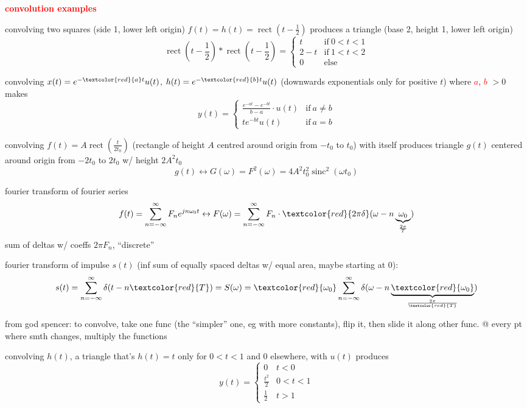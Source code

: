 \documentclass[a5paper, fleqn]{article}
\newcommand{\heading}[1]{\textbf{\textcolor{red}{#1}}}
\newcommand{\emf}[1]{\textcolor{red}{#1}}
\newcommand{\eq}[1]{\textcolor{red}{$#1$}}
\newcommand{\wrap}{\hangpara{0.5cm}{1}}
\DeclareMathOperator{\sinc}{sinc}
\DeclareMathOperator{\rect}{rect}
\begin{document}
\heading{convolution examples}

\wrap convolving two squares (side 1, lower left origin) $f(t) = h(t) = \rect\left(t - \frac{1}{2}\right)$ produces a triangle (base 2, height 1, lower left origin) \[\rect\left(t - \frac{1}{2}\right) * \rect\left(t - \frac{1}{2}\right) = \begin{cases}
    t     & \text{if} ~ 0 < t < 1 \\
    2 - t & \text{if} ~ 1 < t < 2 \\
    0     & \text{else}
  \end{cases}\]

\wrap convolving $x(t) = e^{-\emf{a}t} u(t)$, $h(t) = e^{-\emf{b}t} u(t)$ (downwards exponentials only for positive $t$) where \eq{a}, \eq{b} $> 0$ makes
\[y(t) = \begin{cases}
    \frac{e^{-at} - e^{-bt}}{b - a} \cdot u(t) & \text{if}~ a \neq b \\
    te^{-bt} u(t)                              & \text{if}~ a = b
  \end{cases}\]

\wrap convolving $f(t) = A \rect\left(\frac{t}{2t_0}\right)$ (rectangle of height $A$ centred around origin from $-t_0$ to $t_0$) with itself produces triangle $g(t)$ centered around origin from $-2t_0$ to $2t_0$ w/ height $2A^2t_0$
\[g(t) \leftrightarrow G(\omega) = F^2(\omega) = 4A^2t_0^2 \sinc^2(\omega t_0)\]

fourier transform of fourier series
\[f(t) = \sum_{n = -\infty}^\infty F_n e^{jn\omega_0 t} \leftrightarrow F(\omega) = \sum_{n = -\infty}^\infty F_n \cdot \emf{2\pi \delta}(\omega - n\underbrace{\omega_0}_{\frac{2\pi}{T}})\]
sum of deltas w/ coeffs $2\pi F_n$, ``discrete''

\wrap fourier transform of impulse $s(t)$ (inf sum of equally spaced deltas w/ equal area, maybe starting at 0):
\[s(t) = \sum_{n = -\infty}^\infty \delta(t - n\emf{T}) = S(\omega) = \emf{\omega_0} \sum_{n = -\infty}^\infty \delta(\omega - n\underbrace{\emf{\omega_0}}_{\frac{2\pi}{\emf{T}}})\]

\wrap from god spencer: to convolve, take one func (the ``simpler'' one, eg with more constants), flip it, then slide it along other func. @ every pt where smth changes, multiply the functions

\wrap convolving $h(t)$, a triangle that's $h(t) = t$ only for $0 < t < 1$ and 0 elsewhere, with $u(t)$ produces
\[y(t) = \begin{cases}
    0             & t < 0     \\
    \frac{t^2}{2} & 0 < t < 1 \\
    \frac{1}{2}   & t > 1
  \end{cases}\]
\end{document}
